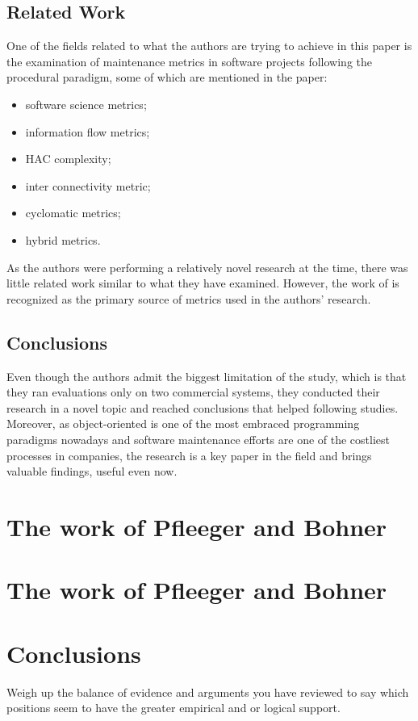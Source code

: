 \documentclass[a4paper,portrait,12pt]{article}
\begin{document}
\subsection{Related Work}
One of the fields related to what the authors are trying to achieve in this
paper is the examination of maintenance metrics in software projects following
the procedural paradigm, some of which are mentioned in the paper:
 \begin{itemize}
  \item \citet{halstead1977elements} software science metrics;
  \item \citet{henry1981software} information flow metrics;
  \item \citet{bail1988program} HAC complexity;
  \item \citet{robillard1989interconnectivity} inter connectivity metric;
  \item \citet{mccabe1976complexity} cyclomatic metrics;
  \item \citet{adamov1990proposal} hybrid metrics.
 \end{itemize}
As the authors were performing a relatively novel research at the time, 
there was little related work similar to what they have examined. However,
the work of \citet{chidamber1994metrics} is recognized as the primary
source of metrics used in the authors' research.

\subsection{Conclusions}
Even though the authors admit the biggest limitation of the study, which is
that they ran evaluations only on two commercial systems, they conducted their research
in a novel topic and reached conclusions that helped following studies. Moreover, 
as object-oriented is one of the most embraced programming paradigms nowadays and 
software maintenance efforts are one of the costliest processes in companies, the
research is a key paper in the field and brings valuable findings, useful even now.
 
\section{The work of Pfleeger and Bohner}

\section{The work of Pfleeger and Bohner}

\section{Conclusions}

Weigh up the balance of evidence and arguments you have reviewed to say which
positions seem to have the greater empirical and or logical support.



\end{document}
